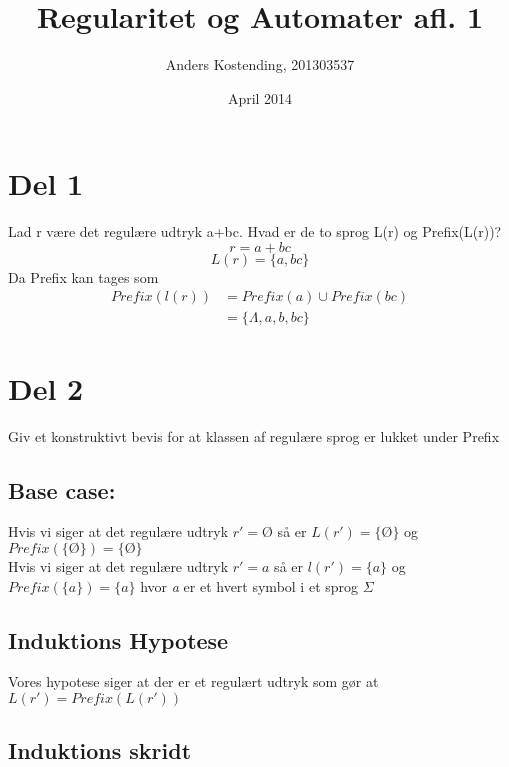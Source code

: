 \documentclass{article}
\title{Regularitet og Automater afl. 1}
\author{Anders Kostending, 201303537}
\date{April 2014}
\begin{document}
\maketitle

\section*{Del 1}
    Lad r være det regulære udtryk a+bc. Hvad er de to sprog L(r) og Prefix(L(r))?
    $$r = a + bc$$
    $$L(r) = \{a,bc\}$$
    Da Prefix kan tages som 
    \begin{equation*} 
        \begin{split}
            Prefix(l(r)) & = Prefix({a}) \cup Prefix({bc})\\
             & = \{\Lambda, a, b, bc\}
        \end{split}
    \end{equation*}

\section*{Del 2}
    Giv et konstruktivt bevis for at klassen af regulære sprog er lukket under Prefix

\subsection*{Base case:}
    Hvis vi siger at det regulære udtryk $r' = Ø$ så er $L(r') = \{Ø\}$ og $Prefix(\{Ø\}) = \{Ø\}$
    \\
    Hvis vi siger at det regulære udtryk $r' = a$ så er $l(r') = \{a\}$ og $Prefix(\{a\}) = \{a\}$ hvor \emph{a} er et hvert symbol i et sprog $\Sigma$

\subsection*{Induktions Hypotese}
    Vores hypotese siger at der er et regulært udtryk som gør at $L(r') = Prefix(L(r'))$

\subsection*{Induktions skridt}
\end{document}
